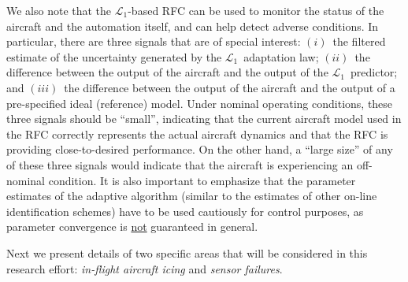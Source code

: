 \documentclass[letter,onecolumn,12pt]{aiaa-tc}
\newcommand{\Lone}{\mathcal{L}_1}
\begin{document}
We also note that the $\Lone$-based RFC can be used to monitor the status of the aircraft and the automation itself, and can help detect adverse conditions. In particular, there are three signals that are of special interest: $(i)$~the filtered estimate of the uncertainty generated by the $\Lone$~adaptation law; $(ii)$~the difference between the output of the aircraft and the output of the $\Lone$~predictor; and $(iii)$~the difference between the output of the aircraft and the output of a pre-specified ideal (reference) model. Under nominal operating conditions, these three signals should be ``small'', indicating that the current aircraft model used in the RFC correctly represents the actual aircraft dynamics and that the RFC is providing close-to-desired performance. On the other hand, a ``large size'' of any of these three signals would indicate that the aircraft is experiencing an off-nominal condition. %
It is also important to emphasize that the parameter estimates of the adaptive algorithm (similar to the estimates of other on-line identification schemes) have to be used cautiously for control purposes, as parameter convergence is \underline{not} guaranteed in general.

\medskip

Next we present details of two specific areas that will be considered in this research effort: \emph{in-flight aircraft icing} and \emph{sensor failures}.
\end{document}
